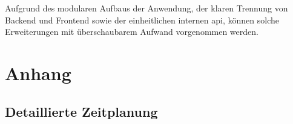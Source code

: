 \documentclass[11pt, a4paper, oneside]{report}
\begin{document}
Aufgrund des modularen Aufbaus der Anwendung, der klaren Trennung von Backend und
Frontend sowie der einheitlichen internen \gls{api}, können solche Erweiterungen
mit überschaubarem Aufwand vorgenommen werden.

\cleardoublepage
\printbibliography[heading=bibnumberline, title={Literaturverzeichnis}]

\appendix
\renewcommand{\thechapter}{\Alph{chapter}}
\chapter{Anhang}

\section{Detaillierte Zeitplanung}
\label{anhang:zeitplanung}
\end{document}
